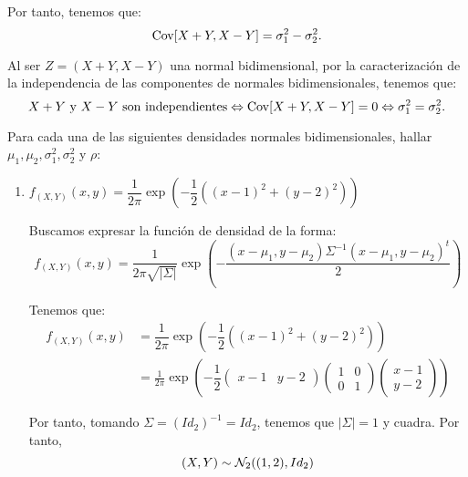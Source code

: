 \begin{ejercicio}
    Por tanto, tenemos que:
    \begin{equation*}
        \operatorname{Cov}[X+Y,X-Y] = \sigma_1^2 - \sigma_2^2.
    \end{equation*}

    Al ser $Z=(X+Y,X-Y)$ una normal bidimensional, por la caracterización de la independencia de las componentes de normales bidimensionales, tenemos que:
    \begin{equation*}
        X+Y\text{ y }X-Y\text{ son independientes} \Leftrightarrow \operatorname{Cov}[X+Y,X-Y] = 0 \Leftrightarrow \sigma_1^2 = \sigma_2^2.
    \end{equation*}
\end{ejercicio}

\begin{ejercicio}
    Para cada una de las siguientes densidades normales bidimensionales, hallar $\mu_1,\mu_2,\sigma_1^2,\sigma_2^2$ y $\rho$:
    \begin{enumerate}
        \item $f_{(X,Y)}(x, y) = \dfrac{1}{2\pi}\exp\left(-\dfrac{1}{2}((x-1)^2 + (y-2)^2)\right)$
        
        Buscamos expresar la función de densidad de la forma:
        \begin{equation*}
            f_{(X,Y)}(x, y) = \dfrac{1}{2\pi\sqrt{|\Sigma|}}\exp\left(-\dfrac{(x-\mu_1,y-\mu_2)\Sigma^{-1}(x-\mu_1,y-\mu_2)^t}{2}\right)
        \end{equation*}

        Tenemos que:
        \begin{align*}
            f_{(X,Y)}(x, y) &= \dfrac{1}{2\pi}\exp\left(-\dfrac{1}{2}((x-1)^2 + (y-2)^2)\right)\\
            &= \frac{1}{2\pi}\exp\left(-\dfrac{1}{2}
            \begin{pmatrix}
                x-1&
                y-2
            \end{pmatrix}
            \begin{pmatrix}
                1 & 0\\
                0 & 1
            \end{pmatrix}
            \begin{pmatrix}
                x-1\\
                y-2
            \end{pmatrix}
            \right)
        \end{align*}

        Por tanto, tomando $\Sigma=(Id_2)^{-1}=Id_2$, tenemos que $|\Sigma|=1$ y cuadra. Por tanto,
        \begin{equation*}
            (X,Y)\sim \mathcal{N}_2((1,2), Id_2)
        \end{equation*}


\end{enumerate}
\end{ejercicio}
